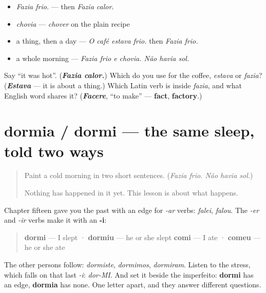 \begin{itemize}
\raggedright
  \item \emph{Fazia frio.} — then \emph{Fazia calor.}
  \item \emph{chovia} — \emph{chover} on the plain recipe
  \item a thing, then a day — \emph{O café estava frio.} then \emph{Fazia frio.}
  \item a whole morning — \emph{Fazia frio e chovia. Não havia sol.}
\end{itemize}

\begin{tcolorbox}[breakable,colback=teal!4,colframe=teal!35!black,title={Before you move on}]
Say \textquotedblleft{}it was hot\textquotedblright{}. (\emph{\textbf{Fazia calor.}}) Which do you use for the coffee, \emph{estava} or \emph{fazia}? (\emph{\textbf{Estava}} — it is about a thing.) Which Latin verb is inside \emph{fazia}, and what English word shares it? (\emph{\textbf{Facere}}, \textquotedblleft{}to make\textquotedblright{} — \textbf{fact}, \textbf{factory}.)
\end{tcolorbox}
\section[dormia / dormi]{dormia / dormi — the same sleep, told two ways}

\label{lesson:PT-C259-dormia-dormi}



\begin{quote}
Paint a cold morning in two short sentences. (\emph{Fazia frio. Não havia sol.})

Nothing has happened in it yet. This lesson is about what happens.
\end{quote}

\begin{grammarlens}[title={Grammar Lens: the edge for -er and -ir verbs}]
Chapter fifteen gave you the past with an edge for \emph{-ar} verbs: \emph{falei}, \emph{falou}. The \emph{-er} and \emph{-ir} verbs make it with an \textbf{-i}:

\begin{quote}
\textbf{dormi} — I slept · \textbf{dormiu} — he or she slept \textbf{comi} — I ate · \textbf{comeu} — he or she ate
\end{quote}

The other persons follow: \emph{dormiste}, \emph{dormimos}, \emph{dormiram}. Listen to the stress, which falls on that last \emph{-i}: \emph{dor-MI}. And set it beside the imperfeito: \textbf{dormi} has an edge, \textbf{dormia} has none. One letter apart, and they answer different questions.
\end{grammarlens}


